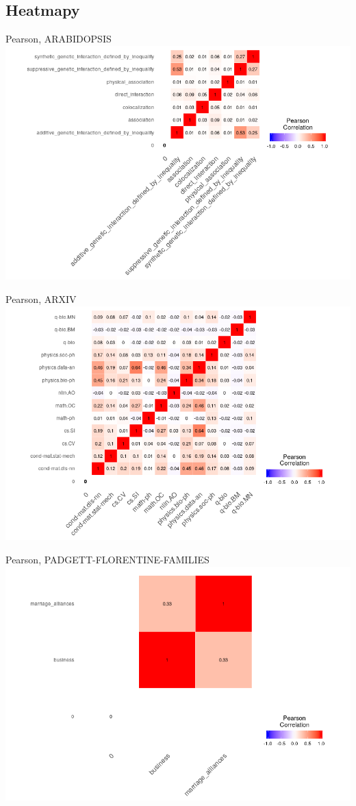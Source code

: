 \documentclass{beamer}
\begin{document}
\subsection{Heatmapy}
\begin{frame}{Pearson, ARABIDOPSIS} 
\includegraphics[scale=0.46]{heamapPearson1}
\end{frame}
\begin{frame}{Pearson, ARXIV} 
\includegraphics[scale=0.46]{heamapPearson2}
\end{frame}
\begin{frame}{Pearson, PADGETT-FLORENTINE-FAMILIES} 
\includegraphics[scale=0.46]{heamapPearson3}
\end{frame}
\end{document}

